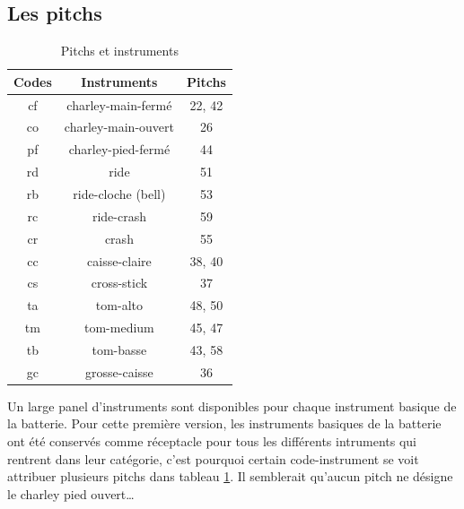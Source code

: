 \subsection*{Les pitchs}
\begin{table}[h]
	\centering
	\begin{tabular}{|c|c|c|} \hline
		Codes & Instruments & Pitchs \\ \hline
		cf & charley-main-fermé & 22, 42 \\
		co & charley-main-ouvert & 26 \\
		pf & charley-pied-fermé & 44 \\
		rd & ride & 51 \\
		rb & ride-cloche (bell) & 53 \\
		rc & ride-crash & 59 \\
		cr & crash & 55 \\
		cc & caisse-claire & 38, 40 \\
		cs & cross-stick & 37 \\
		ta & tom-alto & 48, 50 \\
		tm & tom-medium & 45, 47 \\
		tb & tom-basse & 43, 58 \\
		gc & grosse-caisse & 36 \\ \hline
	\end{tabular}
	\caption{Pitchs et instruments}
	\label{pitchs_instru}
\end{table}
Un large panel d’instruments sont disponibles pour chaque instrument basique de la batterie. Pour cette première version, les instruments basiques de la batterie ont été conservés comme réceptacle pour tous les différents intruments qui rentrent dans leur catégorie, c’est pourquoi certain code-instrument se voit attribuer plusieurs pitchs dans tableau \ref{pitchs_instru}.
Il semblerait qu’aucun pitch ne désigne le charley pied ouvert…
